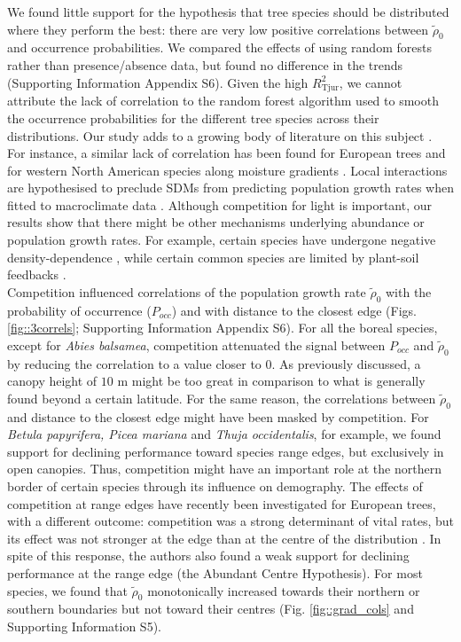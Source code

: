 We found little support for the hypothesis that tree species should be distributed where they perform the best: there are very low positive correlations between $ \tilde \rho_0 $ and occurrence probabilities. We compared the effects of using random forests rather than presence/absence data, but found no difference in the trends (Supporting Information Appendix S6). Given the high $ R_{\text{Tjur}}^{2} $, we cannot attribute the lack of correlation to the random forest algorithm used to smooth the occurrence probabilities for the different tree species across their distributions. Our study adds to a growing body of literature on this subject \citep[and references therein]{Holt2020}. For instance, a similar lack of correlation has been found for European trees \citep[using matrix projection models]{Csergo2017} and for western North American species along moisture gradients \citep{Bohner2019}. Local interactions are hypothesised to preclude SDMs from predicting population growth rates when fitted to macroclimate data \citep{Csergo2017}. Although competition for light is important, our results show that there might be other mechanisms underlying abundance or population growth rates. For example, certain species have undergone negative density-dependence \citep[for rare species]{Yenni2012}, while certain common species are limited by plant-soil feedbacks \citep[\textit{Acer saccharum}]{Solarik2019}. \\

Competition influenced correlations of the population growth rate $ \tilde \rho_0 $ with the probability of occurrence ($ P_{occ} $) and with distance to the closest edge (Figs. \ref{fig::3correls}; Supporting Information Appendix S6). For all the boreal species, except for \textit{Abies balsamea}, competition attenuated the signal between $ P_{occ} $ and $ \tilde \rho_0 $ by reducing the correlation to a value closer to 0. As previously discussed, a canopy height of $ 10 $ m might be too great in comparison to what is generally found beyond a certain latitude. For the same reason, the correlations between $ \tilde \rho_0 $ and distance to the closest edge might have been masked by competition. For \textit{Betula papyrifera, Picea mariana} and \textit{Thuja occidentalis}, for example, we found support for declining performance toward species range edges, but exclusively in open canopies. Thus, competition might have an important role at the northern border of certain species through its influence on demography. The effects of competition at range edges have recently been investigated for European trees, with a different outcome: competition was a strong determinant of vital rates, but its effect was not stronger at the edge than at the centre of the distribution \citep{Kunstler2019}. In spite of this response, the authors also found a weak support for declining performance at the range edge (the Abundant Centre Hypothesis). For most species, we found that $ \tilde \rho_0 $ monotonically increased towards their northern or southern boundaries but not toward their centres (Fig. \ref{fig::grad_cols} and Supporting Information S5).


